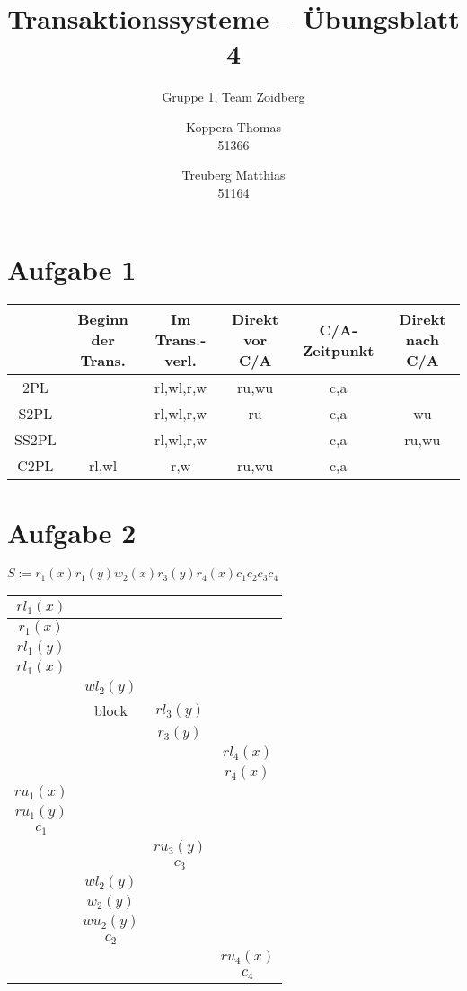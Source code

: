 \documentclass{scrartcl}
\title{Transaktionssysteme -- Übungsblatt 4}
\subtitle{Gruppe 1, Team Zoidberg}
\author{Koppera Thomas \\ 51366
 \and Treuberg Matthias \\ 51164}
\date{ }
\begin{document}
  \maketitle
  
\section*{Aufgabe 1}

\begin{tabular}[ht]{|c|c|c|c|c|c|}
\hline  & Beginn der Trans. & Im Trans.-verl. & Direkt vor C/A & C/A- Zeitpunkt & Direkt nach C/A \\ 
\hline 2PL & & rl,wl,r,w & ru,wu & c,a &  \\ 
\hline S2PL &  & rl,wl,r,w & ru & c,a & wu \\ 
\hline SS2PL &  & rl,wl,r,w & & c,a & ru,wu \\ 
\hline C2PL & rl,wl & r,w & ru,wu & c,a &  \\ 
\hline 
\end{tabular} 


\section*{Aufgabe 2}
$S := r_1(x)r_1(y)w_2(x)r_3(y)r_4(x)c_1c_2c_3c_4$\\
\begin{tabular}{|c|c|c|c|}
\hline $rl_1(x)$ &  &  &  \\ 
\hline $r_1(x)$ &  &  &  \\ 
\hline $rl_1(y)$ &  &  &  \\ 
\hline $rl_1(x)$ &  &  &  \\ 
\hline  & $wl_2(y)$ &  &  \\ 
\hline  & block & $rl_3(y)$ &  \\ 
\hline  &  & $r_3(y)$ &  \\ 
\hline  &  &  & $rl_4(x)$ \\ 
\hline  &  &  & $r_4(x)$ \\ 
\hline $ru_1(x)$ &  &  &  \\ 
\hline $ru_1(y)$ &  &  &  \\ 
\hline $c_1$ &  &  &  \\ 
\hline  &  & $ru_3(y)$ &  \\ 
\hline  &  & $c_3$ &  \\ 
\hline  & $wl_2(y)$ &  &  \\ 
\hline  & $w_2(y)$ &  &  \\ 
\hline  & $wu_2(y)$ &  &  \\ 
\hline  & $c_2$ &  &  \\ 
\hline  &  &  & $ru_4(x)$ \\ 
\hline  &  &  & $c_4$ \\ 
\hline 
\end{tabular}
\end{document}
